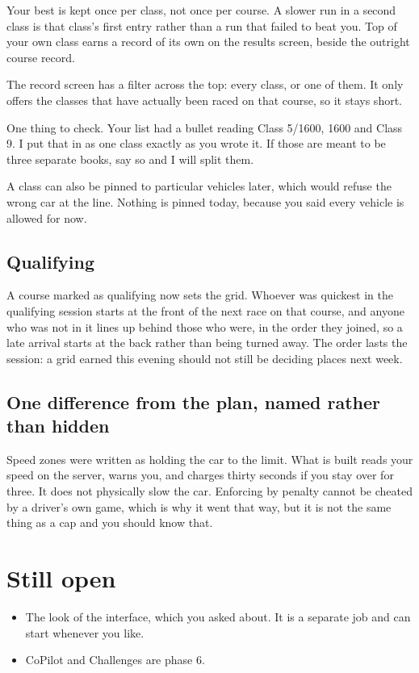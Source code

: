 \documentclass[11pt,a4paper]{article}
\begin{document}
Your best is kept once per class, not once per course. A slower run in a second
class is that class's first entry rather than a run that failed to beat you.
Top of your own class earns a record of its own on the results screen, beside
the outright course record.

The record screen has a filter across the top: every class, or one of them. It
only offers the classes that have actually been raced on that course, so it
stays short.

One thing to check. Your list had a bullet reading Class 5/1600, 1600 and Class
9. I put that in as one class exactly as you wrote it. If those are meant to be
three separate books, say so and I will split them.

A class can also be pinned to particular vehicles later, which would refuse the
wrong car at the line. Nothing is pinned today, because you said every vehicle
is allowed for now.

\subsection*{Qualifying}

A course marked as qualifying now sets the grid. Whoever was quickest in the
qualifying session starts at the front of the next race on that course, and
anyone who was not in it lines up behind those who were, in the order they
joined, so a late arrival starts at the back rather than being turned away. The
order lasts the session: a grid earned this evening should not still be deciding
places next week.

\subsection*{One difference from the plan, named rather than hidden}

Speed zones were written as holding the car to the limit. What is built reads
your speed on the server, warns you, and charges thirty seconds if you stay over
for three. It does not physically slow the car. Enforcing by penalty cannot be
cheated by a driver's own game, which is why it went that way, but it is not the
same thing as a cap and you should know that.

\section{Still open}

\begin{itemize}
  \item The look of the interface, which you asked about. It is a separate
        job and can start whenever you like.
  \item CoPilot and Challenges are phase 6.
\end{itemize}
\end{document}
